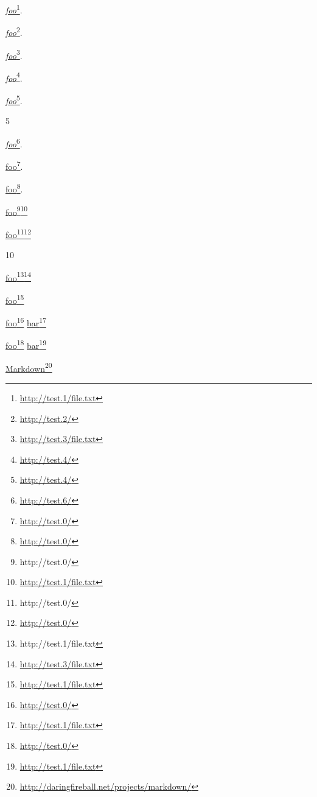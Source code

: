 
\def\mytitle{Reference Links}


\href{http://test.1/file.txt}{\emph{foo}}\footnote{\href{http://test.1/file.txt}{http://test.1/file.txt}}.

\href{http://test.2/}{\emph{foo}}\footnote{\href{http://test.2/}{http://test.2/}}.

\href{http://test.3/file.txt}{\emph{foo}}\footnote{\href{http://test.3/file.txt}{http://test.3/file.txt}}.

\href{http://test.4/}{\emph{foo}}\footnote{\href{http://test.4/}{http://test.4/}}.

\href{http://test.4/}{\emph{foo}}\footnote{\href{http://test.4/}{http://test.4/}}.

5

\href{http://test.6/}{\emph{foo}}\footnote{\href{http://test.6/}{http://test.6/}}.

\href{http://test.0/}{foo}\footnote{\href{http://test.0/}{http://test.0/}}.

\href{http://test.0/}{foo}\footnote{\href{http://test.0/}{http://test.0/}}.

\href{http://test.1/file.txt}{\href{http://test.0/}{foo}\footnote{\href{http://test.0/}{http://test.0/}}}\footnote{\href{http://test.1/file.txt}{http://test.1/file.txt}}

\href{http://test.0/}{\href{http://test.0/}{foo}\footnote{\href{http://test.0/}{http://test.0/}}}\footnote{\href{http://test.0/}{http://test.0/}}

10

\href{http://test.3/file.txt}{\href{http://test.1/file.txt}{foo}\footnote{\href{http://test.1/file.txt}{http://test.1/file.txt}}}\footnote{\href{http://test.3/file.txt}{http://test.3/file.txt}}

\href{http://test.1/file.txt}{foo}\footnote{\href{http://test.1/file.txt}{http://test.1/file.txt}}

\href{http://test.0/}{foo}\footnote{\href{http://test.0/}{http://test.0/}} \href{http://test.1/file.txt}{bar}\footnote{\href{http://test.1/file.txt}{http://test.1/file.txt}}

\href{http://test.0/}{foo}\footnote{\href{http://test.0/}{http://test.0/}}
\href{http://test.1/file.txt}{bar}\footnote{\href{http://test.1/file.txt}{http://test.1/file.txt}}

\href{http://daringfireball.net/projects/markdown/}{Markdown}\footnote{\href{http://daringfireball.net/projects/markdown/}{http://daringfireball.net/projects/markdown/}}

